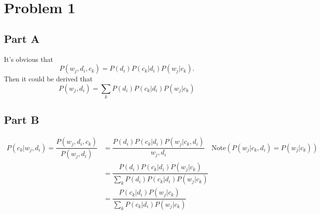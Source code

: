 

\usepackage{amsmath}
\oddsidemargin 0in
\evensidemargin 0in
\textwidth 6.5in
\topmargin -0.5in
\textheight 9.0in




\pagestyle{myheadings}  %

\section{Problem 1}
\subsection{Part A}
It's obvious that 
\[P(w_j,d_i,c_k)=P(d_i)P(c_k|d_i)P(w_j|c_k).\]
Then it could be derived that 
\[P(w_j,d_i)=\sum\limits_{k}P(d_i)P(c_k|d_i)P(w_j|c_k)\]

\subsection{Part B}
\begin{align*}
P(c_k|w_j,d_i)=\dfrac{P(w_j,d_i,c_k)}{P(w_j,d_i)} 
&=\dfrac{P(d_i)P(c_k|d_i)P(w_j|c_k,d_i)}{w_j,d_i} \quad\text{Note} (P(w_j|c_k,d_i)=P(w_j|c_k))\\
&=\dfrac{P(d_i)P(c_k|d_i)P(w_j|c_k)}{\sum\limits_{k}P(d_i)P(c_k|d_i)P(w_j|c_k)}\\
&=\dfrac{P(c_k|d_i)P(w_j|c_k)}{\sum\limits_{k}P(c_k|d_i)P(w_j|c_k)}
\end{align*}

